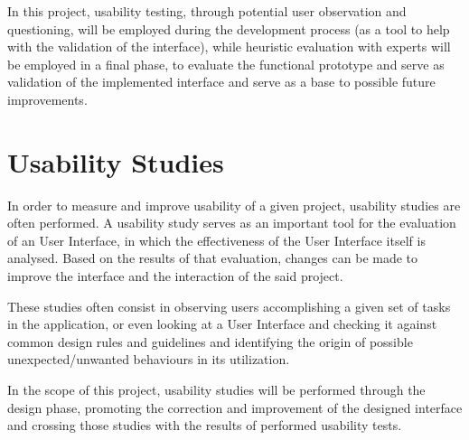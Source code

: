 In this project, usability testing, through potential user observation and questioning, will be employed during the development process (as a tool to help with the validation of the interface), while heuristic evaluation with experts will be employed in a final phase, to evaluate the functional prototype and serve as validation of the implemented interface and serve as a base to possible future improvements.

\section{Usability Studies}

In order to measure and improve usability of a given project, usability studies are often performed. A usability study serves as an important tool for the evaluation of an User Interface, in which the effectiveness of the User Interface itself is analysed. Based on the results of that evaluation, changes can be made to improve the interface and the interaction of the said project.

These studies often consist in observing users accomplishing a given set of tasks in the application, or even looking at a User Interface and checking it against common design rules and guidelines \cite{kn:UUW} and identifying the origin of possible unexpected/unwanted behaviours in its utilization. 

In the scope of this project, usability studies will be performed through the design phase, promoting the correction and improvement of the designed interface and crossing those studies with the results of performed usability tests.








